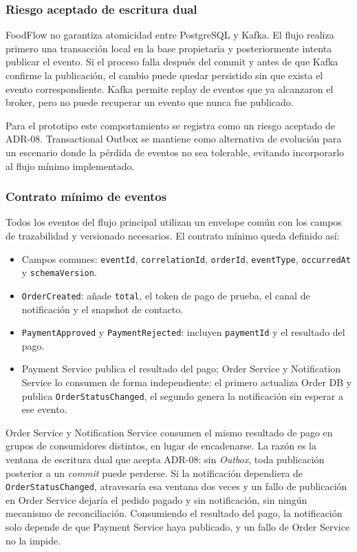 \documentclass[12pt,a4paper]{article}
\begin{document}
\setlength{\tabcolsep}{6pt}
\normalsize

\subsubsection{Riesgo aceptado de escritura dual}

FoodFlow no garantiza atomicidad entre PostgreSQL y Kafka. El flujo realiza primero una transacción local en la base propietaria y posteriormente intenta publicar el evento. Si el proceso falla después del commit y antes de que Kafka confirme la publicación, el cambio puede quedar persistido sin que exista el evento correspondiente. Kafka permite replay de eventos que ya alcanzaron el broker, pero no puede recuperar un evento que nunca fue publicado.

Para el prototipo este comportamiento se registra como un riesgo aceptado de ADR-08. Transactional Outbox se mantiene como alternativa de evolución para un escenario donde la pérdida de eventos no sea tolerable, evitando incorporarlo al flujo mínimo implementado.

\subsubsection{Contrato mínimo de eventos}

Todos los eventos del flujo principal utilizan un envelope común con los campos de trazabilidad y versionado necesarios. El contrato mínimo queda definido así:

\begin{itemize}[leftmargin=*]
    \item Campos comunes: \texttt{eventId}, \texttt{correlationId}, \texttt{orderId}, \texttt{eventType}, \texttt{occurredAt} y \texttt{schemaVersion}.
    \item \texttt{OrderCreated}: añade \texttt{total}, el token de pago de prueba, el canal de notificación y el snapshot de contacto.
    \item \texttt{PaymentApproved} y \texttt{PaymentRejected}: incluyen \texttt{paymentId} y el resultado del pago.
    \item Payment Service publica el resultado del pago; Order Service y Notification Service lo consumen de forma independiente: el primero actualiza Order DB y publica \texttt{OrderStatusChanged}, el segundo genera la notificación sin esperar a ese evento.
\end{itemize}

Order Service y Notification Service consumen el mismo resultado de pago en grupos de consumidores distintos, en lugar de encadenarse. La razón es la ventana de escritura dual que acepta ADR-08: sin \textit{Outbox}, toda publicación posterior a un \textit{commit} puede perderse. Si la notificación dependiera de \texttt{OrderStatusChanged}, atravesaría esa ventana dos veces y un fallo de publicación en Order Service dejaría el pedido pagado y sin notificación, sin ningún mecanismo de reconciliación. Consumiendo el resultado del pago, la notificación solo depende de que Payment Service haya publicado, y un fallo de Order Service no la impide.
\end{document}
